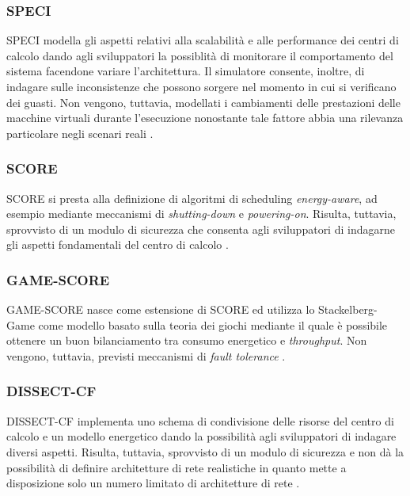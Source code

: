 {\subsubsection*{SPECI}
SPECI \cite{sriram2009speci} modella gli aspetti relativi alla scalabilità e alle performance dei centri di calcolo dando agli sviluppatori la possiblità di monitorare il comportamento del sistema facendone variare l'architettura. Il simulatore consente, inoltre, di indagare sulle inconsistenze che possono sorgere nel momento in cui si verificano dei guasti. Non vengono, tuttavia, modellati i cambiamenti delle prestazioni delle macchine virtuali durante l'esecuzione nonostante tale fattore abbia una rilevanza particolare negli scenari reali \cite{mansouri2020cloud}.  
\subsubsection*{SCORE}
SCORE \cite{fernandez2018score} si presta alla definizione di algoritmi di scheduling \emph{energy-aware}, ad esempio mediante meccanismi di \emph{shutting-down} e \emph{powering-on}. Risulta, tuttavia, sprovvisto di un modulo di sicurezza che consenta agli sviluppatori di indagarne gli aspetti fondamentali del centro di calcolo \cite{mansouri2020cloud}. 
\subsubsection*{GAME-SCORE}
GAME-SCORE \cite{fernandez2019game} nasce come estensione di SCORE ed utilizza lo Stackelberg-Game \cite{fernandez2018stackelberg} come modello basato sulla teoria dei giochi mediante il quale è possibile ottenere un buon bilanciamento tra consumo energetico e \emph{throughput}. Non vengono, tuttavia, previsti meccanismi di \emph{fault tolerance} \cite{mansouri2020cloud}. 
\subsubsection*{DISSECT-CF}
DISSECT-CF \cite{kecskemeti2015dissect} implementa uno schema di condivisione delle risorse del centro di calcolo e un modello energetico dando la possibilità agli sviluppatori di indagare diversi aspetti. Risulta, tuttavia, sprovvisto di un modulo di sicurezza e non dà la possibilità di definire architetture di rete realistiche in quanto mette a disposizione solo un numero limitato di architetture di rete \cite{mansouri2020cloud}.
}